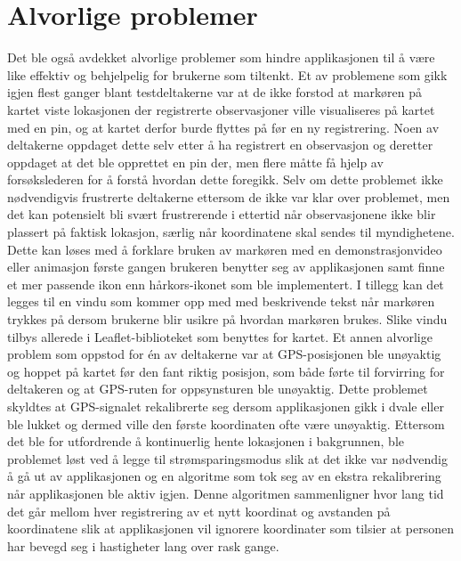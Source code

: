 \section{Alvorlige problemer}
Det ble også avdekket alvorlige problemer som hindre applikasjonen til å være like effektiv og behjelpelig for brukerne som tiltenkt. Et av problemene som gikk igjen flest ganger blant testdeltakerne var at de ikke forstod at markøren på kartet viste lokasjonen der registrerte observasjoner ville visualiseres på kartet med en pin, og at kartet derfor burde flyttes på før en ny registrering. Noen av deltakerne oppdaget dette selv etter å ha registrert en observasjon og deretter oppdaget at det ble opprettet en pin der, men flere måtte få hjelp av forsøkslederen for å forstå hvordan dette foregikk. Selv om dette problemet ikke nødvendigvis frustrerte deltakerne ettersom de ikke var klar over problemet, men det kan potensielt bli svært frustrerende i ettertid når observasjonene ikke blir plassert på faktisk lokasjon, særlig når koordinatene skal sendes til myndighetene. Dette kan løses med å forklare bruken av markøren med en demonstrasjonvideo eller animasjon første gangen brukeren benytter seg av applikasjonen samt finne et mer passende ikon enn hårkors-ikonet som ble implementert. I tillegg kan det legges til en vindu som kommer opp med med beskrivende tekst når markøren trykkes på dersom brukerne blir usikre på hvordan markøren brukes. Slike vindu tilbys allerede i Leaflet-biblioteket som benyttes for kartet.
\newline
\newline
Et annen alvorlige problem som oppstod for én av deltakerne var at GPS-posisjonen ble unøyaktig og hoppet på kartet før den fant riktig posisjon, som både førte til forvirring for deltakeren og at GPS-ruten for oppsynsturen ble unøyaktig. Dette problemet skyldtes at GPS-signalet rekalibrerte seg dersom applikasjonen gikk i dvale eller ble lukket og dermed ville den første koordinaten ofte være unøyaktig. Ettersom det ble for utfordrende å kontinuerlig hente lokasjonen i bakgrunnen, ble problemet løst ved å legge til strømsparingsmodus slik at det ikke var nødvendig å gå ut av applikasjonen og en algoritme som tok seg av en ekstra rekalibrering når applikasjonen ble aktiv igjen. Denne algoritmen sammenligner hvor lang tid det går mellom hver registrering av et nytt koordinat og avstanden på koordinatene slik at applikasjonen vil ignorere koordinater som tilsier at personen har bevegd seg i hastigheter lang over rask gange.
\newline
